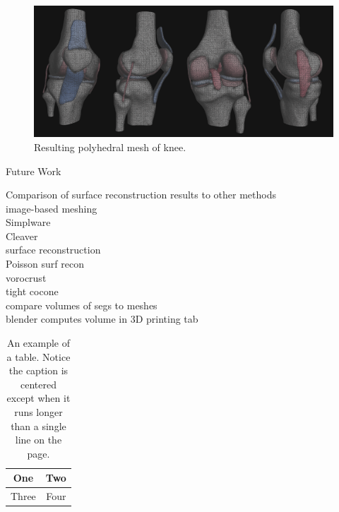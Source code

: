 \begin{figure}
\centering
\includegraphics[scale=0.82]{media/fullmesh.png}
\caption[polyhedral knee]{Resulting polyhedral mesh of knee.}
\label{fig.sample_1}
\end{figure}

Future Work

Comparison of surface reconstruction results to other methods \\
image-based meshing \\
Simplware \\
Cleaver \\
surface reconstruction \\
Poisson surf recon \\
vorocrust \\
tight cocone \\
compare volumes of segs to meshes \\
blender computes volume in 3D printing tab \\

\begin{table}[tbh]
\renewcommand{\arraystretch}{1.3}
\centering
\begin{tabular}{|c||c|}
\hline
One & Two\\
\hline
Three & Four\\
\hline
\end{tabular}
\caption[Example table]{An example of a table. Notice the caption is centered except when it runs longer than a single line on the page.}
\label{tab.example_1}
\end{table}